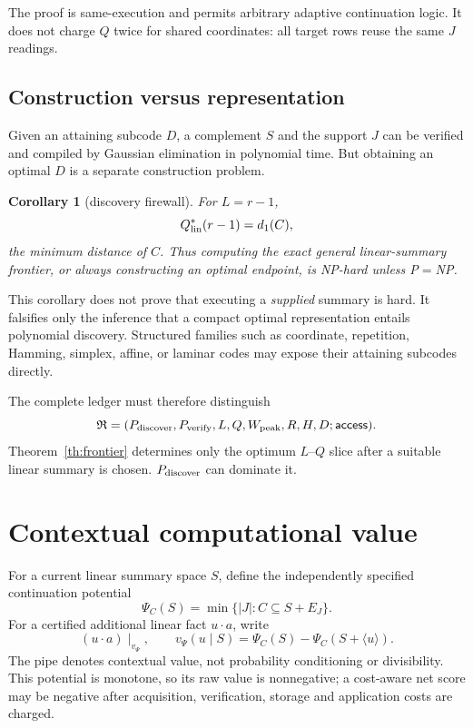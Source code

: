 \documentclass[11pt]{article}
\newtheorem{corollary}[theorem]{Corollary}
\begin{document}
The proof is same-execution and permits arbitrary adaptive continuation logic.  It does not charge $Q$ twice for shared coordinates: all target rows reuse the same $J$ readings.

\subsection{Construction versus representation}

Given an attaining subcode $D$, a complement $S$ and the support $J$ can be verified and compiled by Gaussian elimination in polynomial time.  But obtaining an optimal $D$ is a separate construction problem.

\begin{corollary}[discovery firewall]\label{cor:hard}
For $L=r-1$,
\[
Q^*_{\rm lin}(r-1)=d_1(C),
\]
the minimum distance of $C$.  Thus computing the exact general linear-summary frontier, or always constructing an optimal endpoint, is NP-hard unless P$=$NP.
\end{corollary}

This corollary does not prove that executing a \emph{supplied} summary is hard.  It falsifies only the inference that a compact optimal representation entails polynomial discovery.  Structured families such as coordinate, repetition, Hamming, simplex, affine, or laminar codes may expose their attaining subcodes directly.

The complete ledger must therefore distinguish
\[
\mathfrak R=(P_{\rm discover},P_{\rm verify},L,Q,W_{\rm peak},R,H,D;\mathsf{access}).
\]
Theorem~\ref{th:frontier} determines only the optimum $L$--$Q$ slice after a suitable linear summary is chosen.  $P_{\rm discover}$ can dominate it.

\section{Contextual computational value}

For a current linear summary space $S$, define the independently specified continuation potential
\[
\Psi_C(S)=\min\{|J|:C\subseteq S+E_J\}.
\]
For a certified additional linear fact $u\cdot a$, write
\[
(u\cdot a)\mid_{v_\Psi},\qquad
v_\Psi(u\mid S)=\Psi_C(S)-\Psi_C(S+\langle u\rangle).
\]
The pipe denotes contextual value, not probability conditioning or divisibility.  This potential is monotone, so its raw value is nonnegative; a cost-aware net score may be negative after acquisition, verification, storage and application costs are charged.
\end{document}

